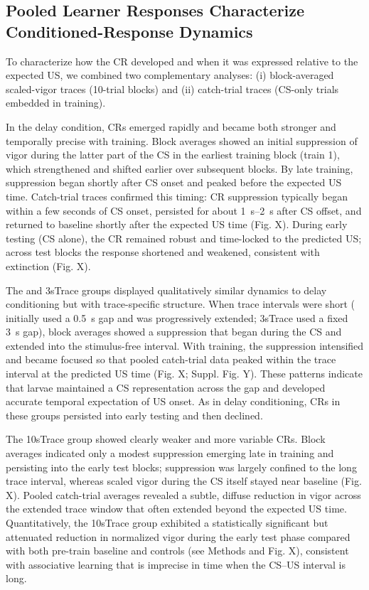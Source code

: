\subsection{Pooled Learner Responses Characterize Conditioned-Response Dynamics}

To characterize how the CR developed and when it was expressed relative to the expected US, we combined two complementary analyses: (i) block-averaged scaled-vigor traces (10-trial blocks) and (ii) catch-trial traces (CS-only trials embedded in training).

In the delay condition, CRs emerged rapidly and became both stronger and temporally precise with training. Block averages showed an initial suppression of vigor during the latter part of the CS in the earliest training block (train 1), which strengthened and shifted earlier over subsequent blocks. By late training, suppression began shortly after CS onset and peaked before the expected US time. Catch-trial traces confirmed this timing: CR suppression typically began within a few seconds of CS onset, persisted for about \SIrange{1}{2}{\second} after CS offset, and returned to baseline shortly after the expected US time (Fig. X). During early testing (CS alone), the CR remained robust and time-locked to the predicted US; across test blocks the response shortened and weakened, consistent with extinction (Fig. X).

The and 3sTrace groups displayed qualitatively similar dynamics to delay conditioning but with trace-specific structure. When trace intervals were short ( initially used a \SI{0.5}{\second} gap and was progressively extended; 3sTrace used a fixed \SI{3}{\second} gap), block averages showed a suppression that began during the CS and extended into the stimulus-free interval. With training, the suppression intensified and became focused so that pooled catch-trial data peaked within the trace interval at the predicted US time (Fig. X; Suppl. Fig. Y). These patterns indicate that larvae maintained a CS representation across the gap and developed accurate temporal expectation of US onset. As in delay conditioning, CRs in these groups persisted into early testing and then declined.

The 10sTrace group showed clearly weaker and more variable CRs. Block averages indicated only a modest suppression emerging late in training and persisting into the early test blocks; suppression was largely confined to the long trace interval, whereas scaled vigor during the CS itself stayed near baseline (Fig. X). Pooled catch-trial averages revealed a subtle, diffuse reduction in vigor across the extended trace window that often extended beyond the expected US time. Quantitatively, the 10sTrace group exhibited a statistically significant but attenuated reduction in normalized vigor during the early test phase compared with both pre-train baseline and controls (see Methods and Fig. X), consistent with associative learning that is imprecise in time when the CS--US interval is long.

